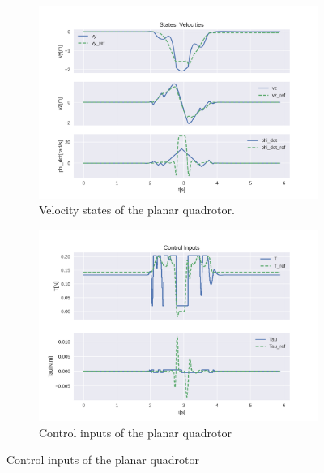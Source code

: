 \documentclass{thesisreport}
\begin{document}
\begin{figure}[H]
\medskip
	\begin{subfigure}{0.48\textwidth}
		\includegraphics[width=\linewidth]{Images/acados_simulations/flip_trajectory/planar_quadrotor/noiseless/rateStates.png}
		\caption{Velocity states of the planar quadrotor.} \label{fig:flip_planar_sim_velocities_noiseless}
	\end{subfigure}\hspace*{\fill}
	\begin{subfigure}{0.48\textwidth}
		\includegraphics[width=\linewidth]{Images/acados_simulations/flip_trajectory/planar_quadrotor/noiseless/controlInputs.png}
		\caption{Control inputs of the planar quadrotor} \label{fig:flip_planar_sim_control_inputs_noiseless}
	\end{subfigure}


\end{figure}
\end{document}
